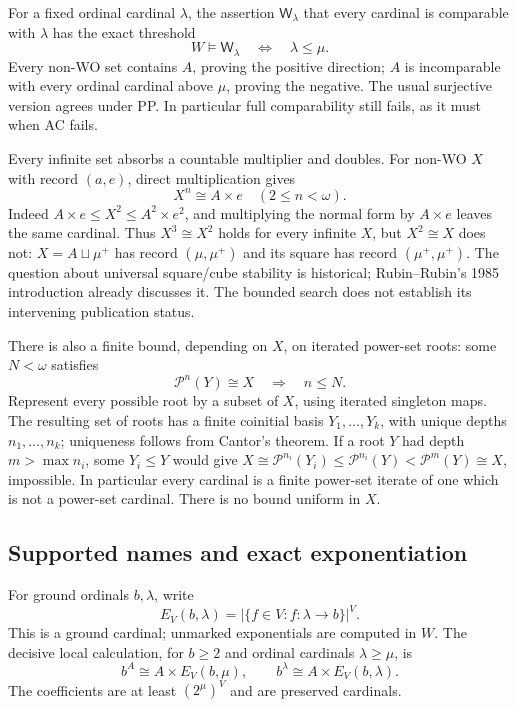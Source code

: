 For a fixed ordinal cardinal $\lambda$, the assertion
$\mathsf W_\lambda$ that every cardinal is comparable with $\lambda$
has the exact threshold
\[
                W\models\mathsf W_\lambda
                       \quad\Longleftrightarrow\quad\lambda\leq\mu.
                                                                  \tag{4}
\]
Every non-WO set contains $A$, proving the positive direction; $A$ is
incomparable with every ordinal cardinal above $\mu$, proving the negative.
The usual surjective version agrees under PP. In particular full
comparability still fails, as it must when AC fails.

Every infinite set absorbs a countable multiplier and doubles. For
non-WO $X$ with record $(a,e)$, direct multiplication gives
\[
                 X^n\cong A\times e\quad(2\leq n<\omega).     \tag{5}
\]
Indeed $A\times e\leq X^2\leq A^2\times e^2$, and multiplying the
normal form by $A\times e$ leaves the same cardinal. Thus
$X^3\cong X^2$ holds for every infinite $X$, but $X^2\cong X$ does not:
$X=A\sqcup\mu^+$ has record $(\mu,\mu^+)$ and its square has record
$(\mu^+,\mu^+)$. The question about universal square/cube stability is
historical; Rubin--Rubin's 1985 introduction already discusses it. The
bounded search does not establish its intervening publication status.

There is also a finite bound, depending on $X$, on iterated power-set
roots: some $N<\omega$ satisfies
\[
                    \mathcal P^n(Y)\cong X\quad\Longrightarrow\quad n\leq N.
                                                                  \tag{6}
\]
Represent every possible root by a subset of $X$, using iterated singleton
maps. The resulting set of roots has a finite coinitial basis
$Y_1,\ldots,Y_k$, with unique depths $n_1,\ldots,n_k$; uniqueness follows
from Cantor's theorem. If a root $Y$ had depth $m>\max n_i$, some
$Y_i\leq Y$ would give
$X\cong\mathcal P^{n_i}(Y_i)\leq\mathcal P^{n_i}(Y)
 <\mathcal P^m(Y)\cong X$, impossible. In particular every cardinal is
a finite power-set iterate of one which is not a power-set cardinal.
There is no bound uniform in $X$.

\subsection{Supported names and exact exponentiation}

For ground ordinals $b,\lambda$, write
\[
             E_V(b,\lambda)=|\{f\in V:f:\lambda\to b\}|^V.
\]
This is a ground cardinal; unmarked exponentials are computed in $W$.
The decisive local calculation, for $b\geq2$ and ordinal cardinals
$\lambda\geq\mu$, is
\[
 b^A\cong A\times E_V(b,\mu),\qquad
 b^\lambda\cong A\times E_V(b,\lambda).                         \tag{7}
\]
The coefficients are at least $(2^\mu)^V$ and are preserved cardinals.

